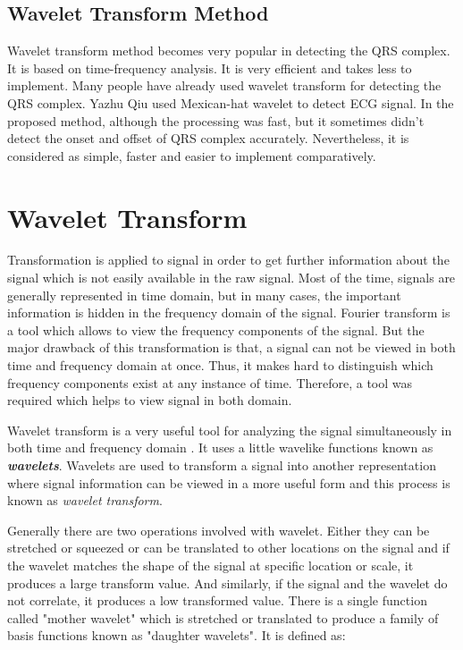 \subsection{Wavelet Transform Method}
Wavelet transform method becomes very popular in detecting the QRS complex. It is based on time-frequency analysis. It is very efficient and takes less to implement. Many people have already used wavelet transform for detecting the QRS complex. Yazhu Qiu \cite{PMID:17228741} used Mexican-hat wavelet to detect ECG signal. In the proposed method, although the processing was fast, but it sometimes didn't detect the onset and offset of QRS complex accurately. Nevertheless, it is considered as simple, faster and easier to implement comparatively.

\section{Wavelet Transform}
Transformation is applied to signal in order to get further information about the signal which is not easily available in the raw signal. Most of the time, signals are generally represented in time domain, but in many cases, the important information is hidden in the frequency domain of the signal. Fourier transform is a tool which allows to view the frequency components of the signal. But the major drawback of this transformation is that, a signal can not be viewed in both time and frequency domain at once. Thus, it makes hard to distinguish which frequency components exist at any instance of time. Therefore, a tool was required which helps to view signal in both domain.

 Wavelet transform is a very useful tool for analyzing the signal simultaneously in both time and frequency domain \cite{addison2017illustrated}. It uses a little wavelike functions known as \textbf{\textit{wavelets}}. Wavelets are used to transform a signal into another representation where signal information can be viewed in a more useful form and this process is known as \textit{wavelet transform}.

Generally there are two operations involved with wavelet. Either they can be stretched or squeezed or can be translated to other locations on the signal and if the wavelet matches the shape of the signal at specific location or scale, it produces a large transform value. And similarly, if the signal and the wavelet do not correlate, it produces a low transformed value. There is a single function called "mother wavelet" which is stretched or translated to produce a family of basis functions known as "daughter wavelets". It is defined as:


